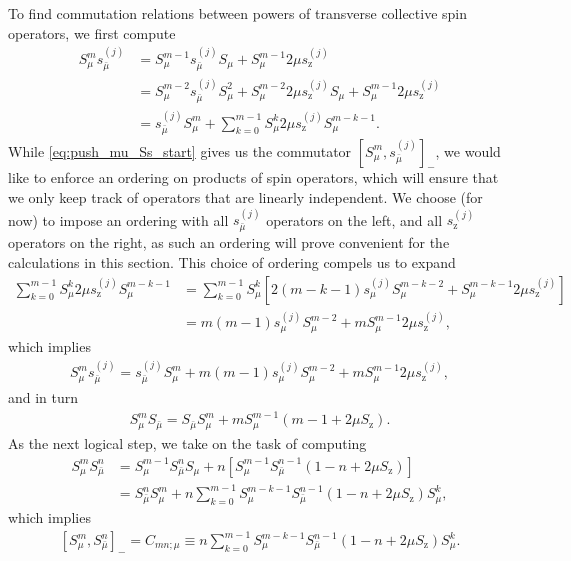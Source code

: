 \documentclass[aps,11pt,notitlepage,nofootinbib,longbibliography]{revtex4-1}
\newcommand{\p}[1]{\left(#1\right)} %
\renewcommand{\sp}[1]{\left[#1\right]} %
\newcommand{\z}{\text{z}}
\newcommand{\bmu}{{\bar\mu}}
\newcommand{\1}{\mathds{1}}
\begin{document}
To find commutation relations between powers of transverse collective
spin operators, we first compute
\begin{align}
  S_\mu^m s_\bmu^{(j)}
  &= S_\mu^{m-1}s_\bmu^{(j)} S_\mu
  + S_\mu^{m-1} 2\mu s_\z^{(j)} \\
  &= S_\mu^{m-2} s_\bmu^{(j)} S_\mu^2
  + S_\mu^{m-2} 2\mu s_\z^{(j)} S_\mu
  + S_\mu^{m-1} 2\mu s_\z^{(j)} \\
  &= s_\bmu^{(j)} S_\mu^m
  + \sum_{k=0}^{m-1} S_\mu^k 2\mu s_\z^{(j)} S_\mu^{m-k-1}
  \label{eq:push_mu_Ss_start}.
\end{align}
While \eqref{eq:push_mu_Ss_start} gives us the commutator
$\sp{S_\mu^m,s_\bmu^{(j)}}_-$, we would like to enforce an ordering on
products of spin operators, which will ensure that we only keep track
of operators that are linearly independent.  We choose (for now) to
impose an ordering with all $s_\bmu^{(j)}$ operators on the left, and
all $s_\z^{(j)}$ operators on the right, as such an ordering will
prove convenient for the calculations in this section.  This choice of
ordering compels us to expand
\begin{align}
  \sum_{k=0}^{m-1} S_\mu^k 2\mu s_\z^{(j)} S_\mu^{m-k-1}
  &= \sum_{k=0}^{m-1} S_\mu^k
  \sp{2\p{m-k-1} s_\mu^{(j)} S_\mu^{m-k-2}
    + S_\mu^{m-k-1} 2\mu s_\z^{(j)}} \\
  &= m \p{m-1} s_\mu^{(j)} S_\mu^{m-2}
  + m S_\mu^{m-1} 2\mu s_\z^{(j)},
\end{align}
which implies
\begin{align}
  S_\mu^m s_\bmu^{(j)}
  = s_\bmu^{(j)} S_\mu^m + m \p{m-1} s_\mu^{(j)} S_\mu^{m-2}
  + m S_\mu^{m-1} 2\mu s_\z^{(j)},
  \label{eq:push_mu_Ss}
\end{align}
and in turn
\begin{align}
  S_\mu^m S_\bmu = S_\bmu S_\mu^m
  + m S_\mu^{m-1} \p{m - 1 + 2\mu S_\z}.
  \label{eq:push_mu_single}
\end{align}
As the next logical step, we take on the task of computing
\begin{align}
  S_\mu^m S_\bmu^n
  &= S_\mu^{m-1} S_\bmu^n S_\mu
  + n \sp{S_\mu^{m-1} S_\bmu^{n-1} \p{1 - n + 2\mu S_\z}} \\
  &= S_\bmu^n S_\mu^m
  + n \sum_{k=0}^{m-1} S_\mu^{m-k-1} S_\bmu^{n-1}
  \p{1 - n + 2\mu S_\z} S_\mu^k,
\end{align}
which implies
\begin{align}
  \sp{S_\mu^m, S_\bmu^n}_-
  = C_{mn;\mu}
  \equiv n \sum_{k=0}^{m-1} S_\mu^{m-k-1} S_\bmu^{n-1}
  \p{1 - n + 2\mu S_\z} S_\mu^k.
\end{align}
\end{document}
